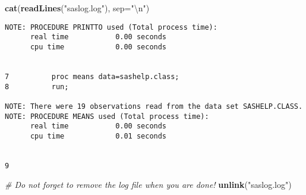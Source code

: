 \documentclass[]{book}
\newenvironment{Shaded}{\begin{snugshade}}{\end{snugshade}}
\newcommand{\CharTok}[1]{\textcolor[rgb]{0.31,0.60,0.02}{#1}}
\newcommand{\CommentTok}[1]{\textcolor[rgb]{0.56,0.35,0.01}{\textit{#1}}}
\newcommand{\DataTypeTok}[1]{\textcolor[rgb]{0.13,0.29,0.53}{#1}}
\newcommand{\KeywordTok}[1]{\textcolor[rgb]{0.13,0.29,0.53}{\textbf{#1}}}
\newcommand{\NormalTok}[1]{#1}
\newcommand{\StringTok}[1]{\textcolor[rgb]{0.31,0.60,0.02}{#1}}
\begin{document}
\begin{Shaded}
\begin{Highlighting}[]
\KeywordTok{cat}\NormalTok{(}\KeywordTok{readLines}\NormalTok{(}\StringTok{"saslog.log"}\NormalTok{), }\DataTypeTok{sep=}\StringTok{"}\CharTok{\textbackslash{}n}\StringTok{"}\NormalTok{)}
\end{Highlighting}
\end{Shaded}

\begin{verbatim}
NOTE: PROCEDURE PRINTTO used (Total process time):
      real time           0.00 seconds
      cpu time            0.00 seconds
      

7          proc means data=sashelp.class;
8          run;

NOTE: There were 19 observations read from the data set SASHELP.CLASS.
NOTE: PROCEDURE MEANS used (Total process time):
      real time           0.00 seconds
      cpu time            0.01 seconds
      

9          
\end{verbatim}

\begin{Shaded}
\begin{Highlighting}[]
\CommentTok{# Do not forget to remove the log file when you are done!}
\KeywordTok{unlink}\NormalTok{(}\StringTok{"saslog.log"}\NormalTok{)}
\end{Highlighting}
\end{Shaded}


\end{document}
